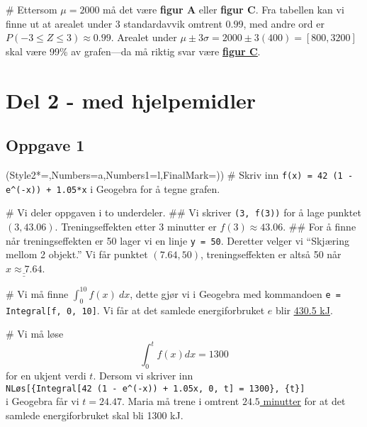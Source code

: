 \documentclass[12pt, a4paper]
{article}						%
\def\answer#1{\underline{\underline{#1}}}
\begin{document}
\begin{easylist}[enumerate]
	# Ettersom $\mu = 2000$ må det være \textbf{figur A} eller \textbf{figur C}.
	Fra tabellen kan vi finne ut at arealet under 3 standardavvik omtrent $0.99$,
	med andre ord er $P(-3 \leq Z \leq 3) \approx 0.99$.
	Arealet under $\mu \pm 3 \sigma = 2000 \pm 3(400) = \left[800, 3200\right]$
	skal være 99\% av grafen---da må riktig svar være \answer{\textbf{figur C}}.

\end{easylist}
	
	
	
	
	
\section*{Del 2 - med hjelpemidler}
\subsection*{Oppgave 1}
\begin{easylist}[enumerate]
	\ListProperties(Style2*=,Numbers=a,Numbers1=l,FinalMark={)})
	# Skriv inn \texttt{f(x) = 42 (1 - e\textasciicircum(-x)) + 1.05*x} i Geogebra for å tegne grafen.
	
	# Vi deler oppgaven i to underdeler.
	## Vi skriver \texttt{(3, f(3))} for å lage punktet $(3,43.06)$. Treningseffekten etter 3 minutter er 
	\answer{$f(3) \approx 43.06$}. 
	## For å finne når treningseffekten er 50 lager vi en linje \texttt{y = 50}.
	Deretter velger vi ``Skjæring mellom 2 objekt.'' Vi får punktet $(7.64, 50)$,
	treningseffekten er altså 50 når $\answer{x \approx 7.64}$.
	
	# Vi må finne $\int_{0}^{10} f(x) \ dx$, dette gjør vi i Geogebra med kommandoen
	\texttt{e = Integral[f, 0, 10]}. Vi får at det samlede energiforbruket $e$ blir \answer{430.5 kJ}.
	
	# Vi må løse
	\begin{equation*}
		\int_{0}^{t} f(x) dx = 1300
	\end{equation*}
	for en ukjent verdi $t$. Dersom vi skriver inn \\
	\texttt{NLøs[\{Integral[42 (1 - e\textasciicircum(-x)) + 1.05x, 0, t] = 1300\}, \{t\}]} \\
	i Geogebra får vi $t = 24.47$. Maria må trene i omtrent \answer{$24.5$ minutter} for at det samlede energiforbruket skal bli 1300 kJ.
\end{easylist}
\end{document}
